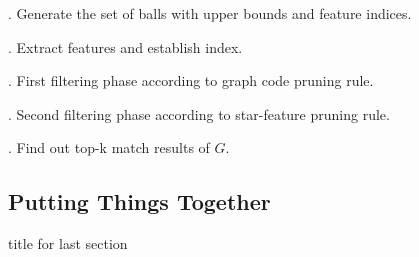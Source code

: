 . Generate the set of balls with upper bounds and feature indices.

. Extract features and establish index.

. First filtering phase according to graph code pruning rule.

. Second filtering phase according to star-feature pruning rule.

. Find out top-k match results of $G$.

\subsection{Putting Things Together}

title for last section 